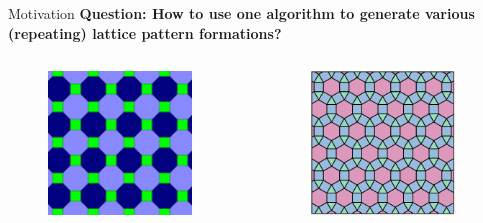 \begin{frame}{Motivation}{}
  \textbf{Question: How to use one algorithm to generate
      various (repeating) lattice pattern formations?}
    \begin{columns}
    \begin{column}{.45\textwidth}
      \begin{figure}
        \centering
        \includegraphics[height=1.5in]{figs/tessellation2.png}
      \end{figure}
    \end{column}
    \begin{column}{.45\textwidth}
       \begin{figure}
         \centering
        \includegraphics[height=1.5in]{figs/tessellation1.png}
      \end{figure}
    \end{column}
  \end{columns} 
\end{frame}


